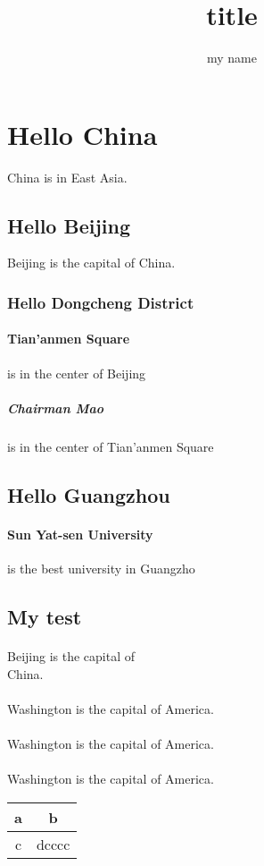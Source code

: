 \documentclass{article}  %
\author{my name}
\title{title}
\begin{document}
 
    \maketitle
   \section{Hello China} China is in East Asia. 

        \subsection{Hello Beijing} Beijing is the capital of China. 

        \subsubsection{Hello Dongcheng District} 
            \paragraph{Tian'anmen Square}is in the center of Beijing 
            \subparagraph{Chairman Mao} is in the center of Tian'anmen Square 

        \subsection{Hello Guangzhou} 
            \paragraph{Sun Yat-sen University} is the best university in Guangzho
        \subsection{My test}

            \paragraph{}Beijing is the capital of \\ China.  %

            \paragraph{}Washington is the capital of America. 

            \paragraph{}Washington is the capital of America.
            \paragraph{}Washington is the capital of America.

        
           
 
            
            \begin{tabular}{|c|c|} 
            \hline 
            a & b \\ 
            \hline 
            c & dcccc\\ 
            \hline 
            \end{tabular} 
\end{document}
